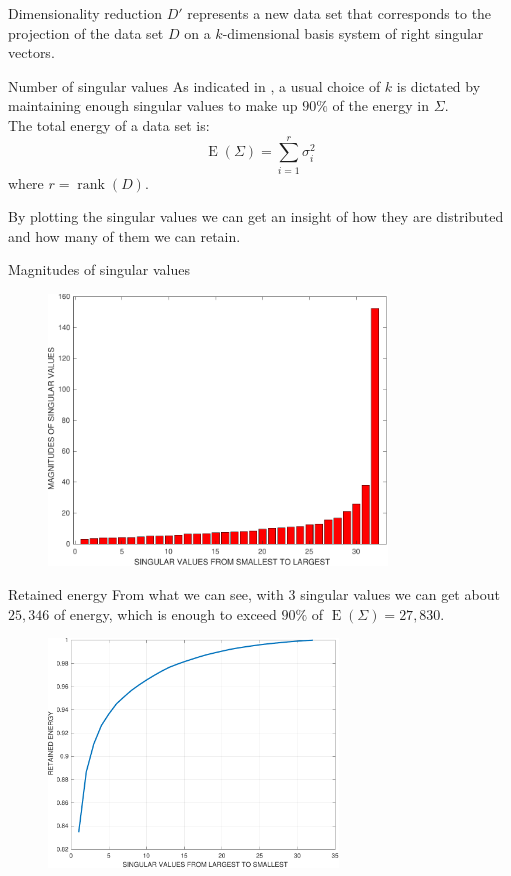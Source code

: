 \documentclass[10pt]{beamer}
\DeclareMathOperator{\rank}{rank}
\DeclareMathOperator{\energy}{E}
\begin{document}
\begin{frame}{Dimensionality reduction}
    $D'$ represents a new data set that corresponds to the projection of the data set $D$ on a $k$-dimensional basis system of right singular vectors. 

    \begin{block}{Number of singular values}
        As indicated in \cite{leskovec2020mining}, a usual choice of $k$ is dictated by maintaining enough singular values to make up $90 \% $ of the energy in $\Sigma$. \\
        The total energy of a data set is:
        $$ \energy ( \Sigma )  = \sum_{i = 1}^{r} \sigma_i^2 $$
        where $r = \rank (D)$.
    \end{block}

    By plotting the singular values we can get an insight of how they are distributed and how many of them we can retain. 
\end{frame}

\begin{frame}{Magnitudes of singular values}
    \begin{figure}[t]
        \includegraphics[width=9cm]{singular_values_magnitudes.pdf}
        \centering
    \end{figure}
\end{frame}

\begin{frame}{Retained energy}
    From what we can see, with $3$ singular values we can get about $25,346$ of energy, which is enough to exceed $90 \%$ of $\energy ( \Sigma ) = 27,830$. 
    \begin{figure}[t]
        \includegraphics[width=7.7cm]{retained_energy.pdf}
        \centering
    \end{figure}
\end{frame}
\end{document}
